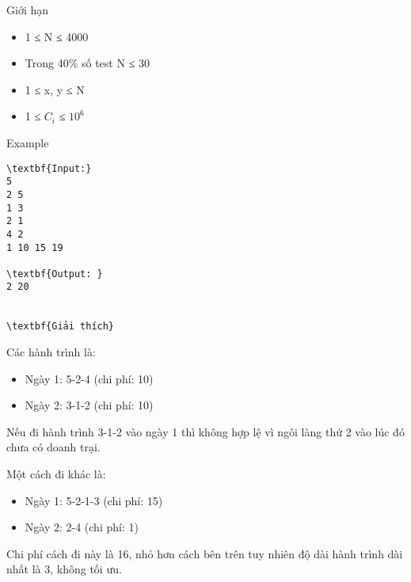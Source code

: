 Giới hạn
\begin{itemize}
	\item 1 ≤ N ≤ 4000
	\item Trong 40\% số test N ≤ 30
	\item 1 ≤ x, y ≤ N
	\item 1 ≤ $C_{i}$ ≤ $10^{6}$
\end{itemize}
\begin{itemize}
\end{itemize}
Example
\begin{verbatim}
\textbf{Input:}
5
2 5
1 3
2 1
4 2
1 10 15 19

\textbf{Output: }
2 20


\textbf{Giải thích}\end{verbatim}

Các hành trình là:
\begin{itemize}
	\item Ngày 1: 5-2-4 (chi phí: 10)
	\item Ngày 2: 3-1-2 (chi phí: 10)
\end{itemize}

Nếu đi hành trình 3-1-2 vào ngày 1 thì không hợp lệ vì ngôi làng thứ 2 vào lúc đó chưa có doanh trại.

Một cách đi khác là:
\begin{itemize}
	\item Ngày 1: 5-2-1-3 (chi phí: 15)
	\item Ngày 2: 2-4 (chi phí: 1)
\end{itemize}

Chi phí cách đi này là 16, nhỏ hơn cách bên trên tuy nhiên độ dài hành trình dài nhất là 3, không tối ưu.
\begin{itemize}
\end{itemize}